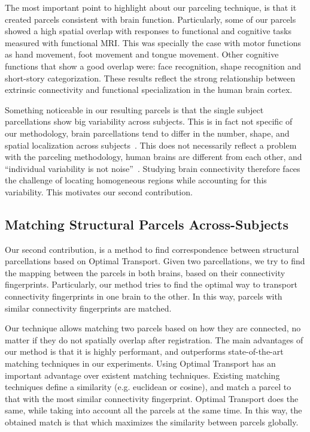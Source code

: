 The most important point to highlight about our parceling technique, is that
it created parcels consistent with brain function. Particularly, some of our
parcels showed a high spatial overlap with responses to functional and cognitive
tasks measured with functional MRI. This was specially the case with motor functions as
hand movement, foot movement and tongue movement. Other cognitive functions that
show a good overlap were: face recognition, shape recognition and short-story
categorization. These results reflect the strong relationship between extrinsic
connectivity and functional specialization in the human brain cortex. 

Something noticeable in our resulting parcels is that the single subject parcellations
show big variability across subjects. This is in fact not specific of our methodology,
brain parcellations tend to differ in the number, shape, and spatial localization
across subjects~\cite{Jbabdi2013}. This does not necessarily reflect a problem
with the parceling methodology, human brains are different from each other,
and ``individual variability is not noise''~\cite{Zilles2013}. Studying brain
connectivity therefore faces the challenge of locating homogeneous regions while
accounting for this variability. This motivates our second contribution.

\subsection{Matching Structural Parcels Across-Subjects}
Our second contribution, is a method to find correspondence between structural
parcellations based on Optimal Transport. Given two parcellations, we try to
find the mapping between the parcels in both brains, based on their connectivity
fingerprints. Particularly, our method tries to find the optimal way to transport
connectivity fingerprints in one brain to the other. In this way, parcels with
similar connectivity fingerprints are matched.

Our technique allows matching two parcels based on how they are connected,
no matter if they do not spatially overlap after registration. The main advantages
of our method is that it is highly performant, and outperforms state-of-the-art
matching techniques in our experiments. Using Optimal Transport has an important
advantage over existent matching techniques. Existing matching techniques define
a similarity (e.g. euclidean or cosine), and match a parcel to that with the
most similar connectivity fingerprint. Optimal Transport does the same, while
taking into account all the parcels at the same time. In this way, the
obtained match is that which maximizes the similarity between parcels globally.

